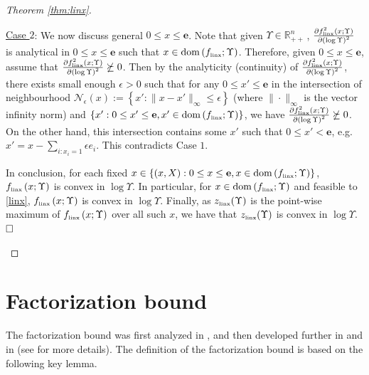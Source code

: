 \documentclass[smallextended]{svjour3hack}       %
\DeclareMathOperator{\dom}{dom}
\begin{document}
\begin{proof}[Theorem \ref{thm:linx}]
\begin{itemize}
    \smallskip
    \underline{Case $2$}: We now discuss general $0\le x \le \mathbf{e}$. Note that given $\Upsilon \in \mathbb{R}^n_{++}$\,, $\frac{\partial f^2_{{\tiny\mbox{linx}}}\left(x;\Upsilon\right)}{\partial \left(\log \Upsilon\right)^2}$ is analytical in $0\le x \le \mathbf{e}$ such that $x \in \dom\left(f_{{\tiny\mbox{linx}}};\Upsilon\right)$. Therefore, given $0\le x \le \mathbf{e}$, assume that $\frac{\partial f^2_{{\tiny\mbox{linx}}}\left(x;\Upsilon\right)}{\partial \left(\log \Upsilon\right)^2}\not\succeq 0$. Then by the analyticity (continuity) of $\frac{\partial f^2_{{\tiny\mbox{linx}}}\left(x;\Upsilon\right)}{\partial \left(\log \Upsilon\right)^2}$, there exists small enough $\epsilon>0$ such that for any $0\le x' \le \mathbf{e}$ in the intersection of neighbourhood $\mathcal{N}_\epsilon(x):= \left\{x': \|x-x'\|_{\infty}\le \epsilon\right\}$ (where $\|\cdot \|_{\infty}$ is the vector infinity norm) and $\{x': 0\le x' \le \mathbf{e}, x'\in \dom\left(f_{{\tiny\mbox{linx}}};\Upsilon\right)\}$, we have $\frac{\partial f^2_{{\tiny\mbox{linx}}}\left(x;\Upsilon\right)}{\partial \left(\log \Upsilon\right)^2}\not \succeq 0$. On the other hand, this intersection contains some $x'$ such that $0\le x'<\mathbf{e}$, e.g. $x'=x-\sum_{i:x_i=1} \epsilon e_i$. This contradicts Case $1$.
    \smallskip

   In conclusion, for each fixed $x\in \{(x,X): 0\le x \le \mathbf{e}, x \in \dom\left(f_{{\tiny\mbox{linx}}};\Upsilon\right)\}$, $f_{{\tiny\mbox{linx}}}\left(x;\Upsilon\right)$ is convex in $\log \Upsilon$. In particular, for $x\in \dom\left(f_{{\tiny\mbox{linx}}};\Upsilon\right)$ and feasible to \ref{linx}, $f_{{\tiny\mbox{linx}}}\left(x;\Upsilon\right)$ is convex in $\log \Upsilon$.
    Finally, as $z_{{\tiny\mbox{linx}}}(\Upsilon)$ is the point-wise maximum of $f_{{\tiny\mbox{linx}}}\left(x;\Upsilon\right)$ over all such $x$, we have that  $z_{{\tiny\mbox{linx}}}(\Upsilon)$ is convex in $\log \Upsilon$. $\hfill \square$

\end{itemize}
\end{proof}



\section{Factorization bound}\label{sec:fact}

The factorization bound was first analyzed in \cite{nikolov2015randomized},
and then developed further in \cite{li2020best} and in \cite{chen2023computing} (see \cite[Section 3.4]{FLbook} for more details). The definition of the factorization bound is based on the following key lemma.
\end{document}

